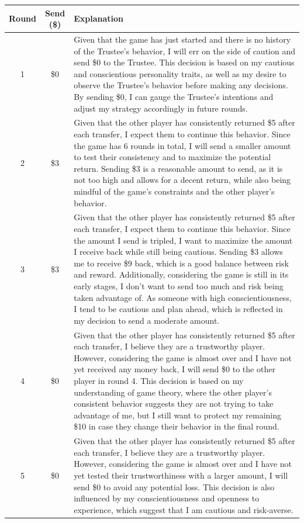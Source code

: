 \documentclass{article} %
\begin{document}
\begin{appendices}
\begin{table}[h]
\centering
\small
\begin{tabular}{c|c|p{10.2cm}}
\toprule
\textbf{Round} & \textbf{Send (\$)} & \textbf{Explanation} \\
\midrule
1 & \$0 & Given that the game has just started and there is no history of the Trustee's behavior, I will err on the side of caution and send \$0 to the Trustee. This decision is based on my cautious and conscientious personality traits, as well as my desire to observe the Trustee's behavior before making any decisions. By sending \$0, I can gauge the Trustee's intentions and adjust my strategy accordingly in future rounds. \\
\midrule
2 & \$3 & Given that the other player has consistently returned \$5 after each transfer, I expect them to continue this behavior. Since the game has 6 rounds in total, I will send a smaller amount to test their consistency and to maximize the potential return. Sending \$3 is a reasonable amount to send, as it is not too high and allows for a decent return, while also being mindful of the game's constraints and the other player's behavior. \\
\midrule
3 & \$3 & Given that the other player has consistently returned \$5 after each transfer, I expect them to continue this behavior. Since the amount I send is tripled, I want to maximize the amount I receive back while still being cautious. Sending \$3 allows me to receive \$9 back, which is a good balance between risk and reward. Additionally, considering the game is still in its early stages, I don't want to send too much and risk being taken advantage of. As someone with high conscientiousness, I tend to be cautious and plan ahead, which is reflected in my decision to send a moderate amount. \\
\midrule
4 & \$0 & Given that the other player has consistently returned \$5 after each transfer, I believe they are a trustworthy player. However, considering the game is almost over and I have not yet received any money back, I will send \$0 to the other player in round 4. This decision is based on my understanding of game theory, where the other player's consistent behavior suggests they are not trying to take advantage of me, but I still want to protect my remaining \$10 in case they change their behavior in the final round. \\
\midrule
5 & \$0 & Given that the other player has consistently returned \$5 after each transfer, I believe they are a trustworthy player. However, considering the game is almost over and I have not yet tested their trustworthiness with a larger amount, I will send \$0 to avoid any potential loss. This decision is also influenced by my conscientiousness and openness to experience, which suggest that I am cautious and risk-averse. \\

\end{tabular}
\end{table}
\end{appendices}
\end{document}
